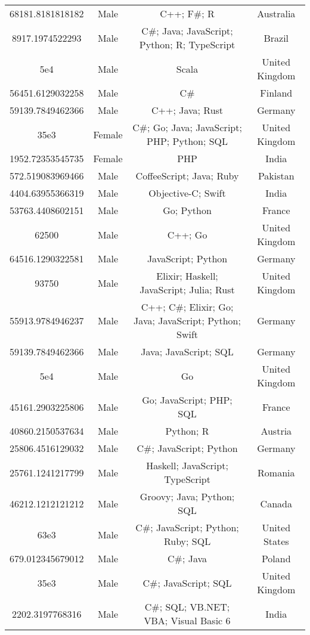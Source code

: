 \begin{center}
\begin{tabular}{ |c|c|c|c| }
68181.8181818182  &  Male  &  C++; F\#; R  &  Australia  \\ 
8917.1974522293  &  Male  &  C\#; Java; JavaScript; Python; R; TypeScript  &  Brazil  \\ 
5e4  &  Male  &  Scala  &  United Kingdom  \\ 
56451.6129032258  &  Male  &  C\#  &  Finland  \\ 
59139.7849462366  &  Male  &  C++; Java; Rust  &  Germany  \\ 
35e3  &  Female  &  C\#; Go; Java; JavaScript; PHP; Python; SQL  &  United Kingdom  \\ 
1952.72353545735  &  Female  &  PHP  &  India  \\ 
572.519083969466  &  Male  &  CoffeeScript; Java; Ruby  &  Pakistan  \\ 
4404.63955366319  &  Male  &  Objective-C; Swift  &  India  \\ 
53763.4408602151  &  Male  &  Go; Python  &  France  \\ 
62500  &  Male  &  C++; Go  &  United Kingdom  \\ 
64516.1290322581  &  Male  &  JavaScript; Python  &  Germany  \\ 
93750  &  Male  &  Elixir; Haskell; JavaScript; Julia; Rust  &  United Kingdom  \\ 
55913.9784946237  &  Male  &  C++; C\#; Elixir; Go; Java; JavaScript; Python; Swift  &  Germany  \\ 
59139.7849462366  &  Male  &  Java; JavaScript; SQL  &  Germany  \\ 
5e4  &  Male  &  Go  &  United Kingdom  \\ 
45161.2903225806  &  Male  &  Go; JavaScript; PHP; SQL  &  France  \\ 
40860.2150537634  &  Male  &  Python; R  &  Austria  \\ 
25806.4516129032  &  Male  &  C\#; JavaScript; Python  &  Germany  \\ 
25761.1241217799  &  Male  &  Haskell; JavaScript; TypeScript  &  Romania  \\ 
46212.1212121212  &  Male  &  Groovy; Java; Python; SQL  &  Canada  \\ 
63e3  &  Male  &  C\#; JavaScript; Python; Ruby; SQL  &  United States  \\ 
679.012345679012  &  Male  &  C\#; Java  &  Poland  \\ 
35e3  &  Male  &  C\#; JavaScript; SQL  &  United Kingdom  \\ 
2202.3197768316  &  Male  &  C\#; SQL; VB.NET; VBA; Visual Basic 6  &  India  \\ 

\end{tabular}
\end{center}
